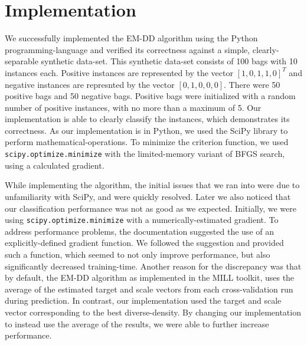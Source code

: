 \documentclass[conference]{IEEEtran}
\begin{document}
\section{Implementation}

We successfully implemented the EM-DD algorithm using the Python programming-language and verified its correctness against a simple, clearly-separable synthetic data-set. This synthetic data-set consists of 100 bags with 10 instances each. Positive instances are represented by the vector $[1, 0, 1, 1, 0]^T$ and negative instances are represnted by the vector $[0, 1, 0, 0, 0]$. There were 50 positive bags and 50 negative bags. Positive bags were initialized with a random number of positive instances, with no more than a maximum of 5. Our implementation is able to clearly classify the instances, which demonstrates its correctness. As our implementation is in Python, we used the SciPy library to perform mathematical-operations. To minimize the criterion function, we used \texttt{scipy.optimize.minimize} with the limited-memory variant of BFGS search\cite{byrd1995limited}, using a calculated gradient.  

While implementing the algorithm, the initial issues that we ran into were due to unfamiliarity with SciPy, and were quickly resolved. Later we also noticed that our classification performance was not as good as we expected. Initially, we were using \texttt{scipy.optimize.minimize} with a numerically-estimated gradient. To address performance problems, the documentation suggested the use of an explicitly-defined gradient function. We followed the suggestion and provided such a function, which seemed to not only improve performance, but also significantly decreased training-time. Another reason for the discrepancy was that by default, the EM-DD algorithm as implemented in the MILL toolkit, uses the average of the estimated target and scale vectors from each cross-validation run during prediction. In contrast, our implementation used the target and scale vector corresponding to the best diverse-density. By changing our implementation to instead use the average of the results, we were able to further increase performance.
\end{document}

